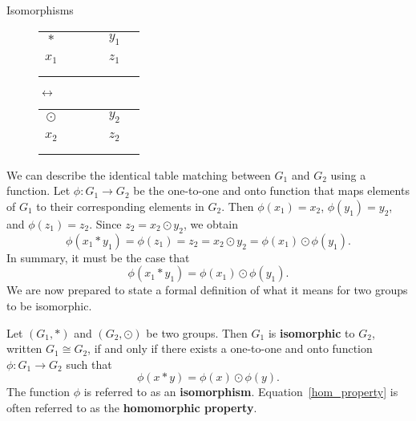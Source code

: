 \begin{section}{Isomorphisms}
\begin{figure}[!ht]
\begin{center}
\begin{tabular}{c!{\vrule width 2pt}ccc|c|c}
$*$    & & & & $y_1$  & \\ 
 & & & &     & \\ \hline
{}$x_1$ & & & & $z_1$ & \\ \hline
 & & & &    & \\
 & & & &    &
\end{tabular}
\hspace{1cm}
$\longleftrightarrow$
\hspace{1cm}
\begin{tabular}{c!{\vrule width 2pt}ccc|c|c}
$\odot$    & & & & $y_2$  & \\ 
 & & & &     & \\ \hline
{}$x_2$ & & & & $z_2$ & \\ \hline
 & & & &    & \\
 & & & &    &
\end{tabular}
\end{center}
\caption{}\label{fig:isoGroupTables}
\end{figure}

We can describe the identical table matching between $G_1$ and $G_2$ using a function.  Let $\phi:G_1\to G_2$ be the one-to-one and onto function that maps elements of $G_1$ to their corresponding elements in $G_2$.  Then $\phi(x_1)=x_2$, $\phi(y_1)=y_2$, and $\phi(z_1)=z_2$.  Since $z_2=x_2\odot y_2$, we obtain
\[
\phi(x_1*y_1)=\phi(z_1)=z_2=x_2\odot y_2=\phi(x_1)\odot \phi(y_1).
\]
In summary, it must be the case that 
\[
\phi(x_1*y_1)=\phi(x_1)\odot \phi(y_1).
\]
We are now prepared to state a formal definition of what it means for two groups to be isomorphic.

\begin{definition}\label{def:iso}
Let $(G_1,*)$ and $(G_2,\odot)$ be two groups.  Then $G_1$ is \textbf{isomorphic} to $G_2$, written $G_1\cong G_2$, if and only if there exists a one-to-one and onto function $\phi:G_1\to G_2$ such that
\begin{equation}\label{hom_property}
\phi(x*y)=\phi(x)\odot \phi(y).
\end{equation}
The function $\phi$ is referred to as an \textbf{isomorphism}.  Equation~\ref{hom_property} is often referred to as the \textbf{homomorphic property}.
\end{definition}


\end{section}
